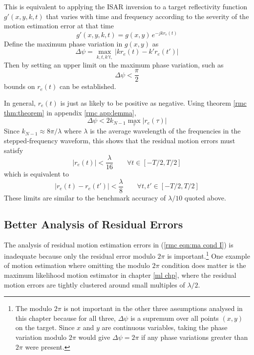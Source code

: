 This is equivalent to applying the ISAR inversion to a target reflectivity
function $g'(x,y,k,t)$ that varies with time and frequency according to the
severity of the motion estimation error at that time
\begin{equation}
g'(x,y,k,t)=g(x,y)\,e^{-jkr_e(t)}
\end{equation}
Define the maximum phase variation in $g(x,y)$ as
\begin{equation}
\Delta\psi=\max_{k,t,k't,}\left|kr_e(t)-k'r_e(t')\right|
\end{equation}
Then by setting an upper limit on the maximum phase variation, such as 
\begin{equation}
\Delta\psi<\frac{\pi}{2}
\end{equation}
bounds on $r_e(t)$ can be established.

In general, $r_e(t)$ is just as likely to be positive as negative.  Using
theorem \ref{rmc thm:theorem} in appendix \ref{rmc app:lemma},
\begin{equation}
\Delta\psi<2k_{N-1}\max_{\tau} \left|r_e(\tau)\right|
\end{equation}
Since $k_{N-1}\approx 8\pi/\lambda$ where $\lambda$ is the average
wavelength of the frequencies in the stepped-frequency waveform, 
this shows that the residual motion errors must satisfy
\begin{equation}
\left|r_e(t)\right|<\frac{\lambda}{16}\qquad\forall t\in[-T/2,T/2]
\end{equation}
which is equivalent to
\begin{equation}\label{rmc eqn:ma cond I}
\left|r_e(t)-r_e(t')\right|<\frac{\lambda}{8}\qquad\forall t,t'\in[-T/2,T/2]
\end{equation}
These limits are similar to the benchmark accuracy of $\lambda/10$ quoted
above.


\subsection{Better Analysis of Residual Errors}

The analysis of residual motion estimation errors in (\ref{rmc eqn:ma cond
I}) is inadequate because only the residual error modulo $2\pi$ is
important.\footnote{The modulo $2\pi$ is not important in the other three
assumptions analysed in this chapter because for all three, $\Delta\psi$ is
a supremum over all points $(x,y)$ on the target.  Since $x$ and $y$ are
continuous variables, taking the phase variation modulo $2\pi$ would give
$\Delta\psi=2\pi$ if any phase variations greater than $2\pi$ were
present.}  One example of motion estimation where omitting the modulo $2\pi$ 
condition  does matter is
the maximum likelihood motion estimator in chapter \ref{ml chp}, where the
residual motion errors are tightly clustered around small multiples of
$\lambda/2$.

